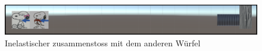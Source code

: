 \documentclass[../main.tex]{subfiles}
\begin{document}
\begin{enumerate}
     \begin{figure}[H]
                \begin{center}
                    \centerline{\includegraphics[width=155mm]{./images/2Lab_2dPictureNr3.png}}
                    \caption{Inelastischer zusammenstoss mit dem anderen Würfel}
                    \label{fig:2Lab_2dPictureNr3}
                \end{center}
     \end{figure}
 \end{enumerate}
\end{document}
